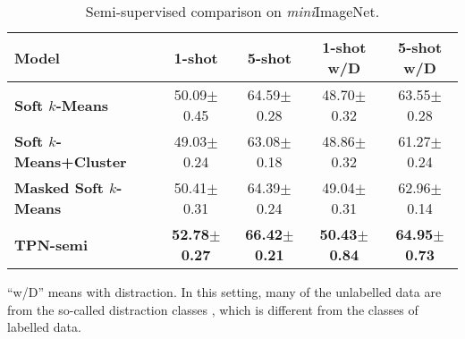 \documentclass{article} \usepackage{iclr2019_conference,times}
\def\mini{{\textit{mini}ImageNet}}
\begin{document}
\begin{table}[ht]
\centering
\begin{threeparttable}
\small
\caption{Semi-supervised comparison on \mini.}
\label{semi-mini-std}
\begin{tabular}{lcccc}
\hline
Model   & \multicolumn{1}{c}{1-shot} & \multicolumn{1}{c}{5-shot} & \multicolumn{1}{c}{1-shot w/D} & \multicolumn{1}{c}{5-shot w/D} \\ \hline
\textbf{Soft $k$-Means}          & 50.09$\pm$0.45 & 64.59$\pm$0.28 & 48.70$\pm$0.32 & 63.55$\pm$0.28 \\
\textbf{Soft $k$-Means+Cluster}  & 49.03$\pm$0.24 & 63.08$\pm$0.18 & 48.86$\pm$0.32 & 61.27$\pm$0.24 \\
\textbf{Masked Soft $k$-Means}   & 50.41$\pm$0.31 & 64.39$\pm$0.24 & 49.04$\pm$0.31 & 62.96$\pm$0.14 \\ \hline
\textbf{TPN-semi}                & \textbf{52.78$\pm$0.27} & \textbf{66.42$\pm$0.21} & \textbf{50.43$\pm$0.84} & \textbf{64.95$\pm$0.73}\\ \hline
\end{tabular}
\begin{tablenotes}
  	\item * ``w/D'' means with distraction. In this setting, many of the unlabelled data are from the so-called distraction classes , which is different from the classes of labelled data.
\end{tablenotes} 
\end{threeparttable}
\end{table}
\end{document}
